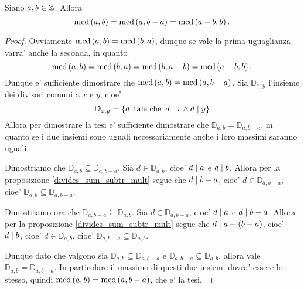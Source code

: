 \begin{theorem} \label{mcd_a_a-b}
    Siano $a, b \in \mathbb{Z}$. Allora
    \begin{equation}
        \operatorname{mcd}\left(a, b\right) = \operatorname{mcd}\left(a, b - a\right) = \operatorname{mcd}\left(a - b, b\right).
    \end{equation} 
\end{theorem}
\begin{proof}  
    Ovviamente $\operatorname{mcd}\left(a, b\right) = \operatorname{mcd}\left(b, a\right)$, dunque se vale la prima uguaglianza varra' anche la seconda,
    in quanto 
    \[
       \operatorname{mcd}\left(a, b\right) = \operatorname{mcd}\left(b, a\right) = \operatorname{mcd}\left(b, a - b\right) = \operatorname{mcd}\left(a - b, b\right).
    \] 
    Dunque e' sufficiente
    dimostrare che $\operatorname{mcd}\left(a, b\right) = \operatorname{mcd}\left(a, b - a\right)$.
    Sia $\mathbb{D}_{x, y}$ l'insieme dei divisori comuni a $x$ e $y$, cioe'
    \[
        \mathbb{D}_{x, y} = \left\{d \operatorname{\text{ tale che }} d \mid x \land d \mid y \right\}  
    \]
    Allora per dimostrare la tesi e' sufficiente dimostrare che $\mathbb{D}_{a, b} = \mathbb{D}_{a, b - a}$, in quanto
    se i due insiemi sono uguali necessariamente anche i loro massimi saranno uguali.

    Dimostriamo che $\mathbb{D}_{a, b} \subseteq \mathbb{D}_{a, b - a}$. Sia $d \in \mathbb{D}_{a, b}$, 
    cioe' $d \mid a$ e $d \mid b$. Allora per la proposizione \ref{divides_sum_subtr_mult} segue che
    $d \mid b - a$, cioe' $d \in \mathbb{D}_{a, b - a}$, 
    cioe' $\mathbb{D}_{a, b} \subseteq \mathbb{D}_{a, b - a}$.

    Dimostriamo ora che $\mathbb{D}_{a, b - a} \subseteq \mathbb{D}_{a, b}$. 
    Sia $d \in \mathbb{D}_{a, b - a}$, 
    cioe' $d \mid a$ e $d \mid b - a$. Allora per la proposizione \ref{divides_sum_subtr_mult} segue che
    $d \mid a + (b - a)$, cioe' $d \mid b$, cioe' $d \in \mathbb{D}_{a, b}$, 
    cioe' $\mathbb{D}_{a, b - a} \subseteq \mathbb{D}_{a, b}$.

    Dunque dato che valgono sia $\mathbb{D}_{a, b} \subseteq \mathbb{D}_{a, b - a}$ e 
    $\mathbb{D}_{a, b - a} \subseteq \mathbb{D}_{a, b}$, allora vale
     $\mathbb{D}_{a, b} = \mathbb{D}_{a, b - a}$. In particolare il massimo di questi due insiemi
     dovra' essere lo stesso, quindi $\operatorname{mcd}\left(a, b\right) = \operatorname{mcd}\left(a, b - a\right)$, che e' la tesi.
\end{proof}

